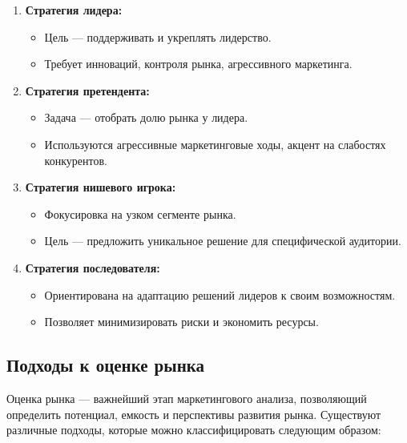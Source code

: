 \begin{enumerate}
    \item \textbf{Стратегия лидера:}
    \begin{itemize}
        \item Цель — поддерживать и укреплять лидерство.
        \item Требует инноваций, контроля рынка, агрессивного маркетинга.
    \end{itemize}
    \item \textbf{Стратегия претендента:}
    \begin{itemize}
        \item Задача — отобрать долю рынка у лидера.
        \item Используются агрессивные маркетинговые ходы, акцент на слабостях конкурентов.
    \end{itemize}
    \item \textbf{Стратегия нишевого игрока:}
    \begin{itemize}
        \item Фокусировка на узком сегменте рынка.
        \item Цель — предложить уникальное решение для специфической аудитории.
    \end{itemize}
    \item \textbf{Стратегия последователя:}
    \begin{itemize}
        \item Ориентирована на адаптацию решений лидеров к своим возможностям.
        \item Позволяет минимизировать риски и экономить ресурсы.
    \end{itemize}
\end{enumerate}

\pagebreak

\subsection{Подходы к оценке рынка}

Оценка рынка --- важнейший этап маркетингового анализа, позволяющий определить потенциал, емкость и перспективы развития рынка. Существуют различные подходы, которые можно классифицировать следующим образом:

